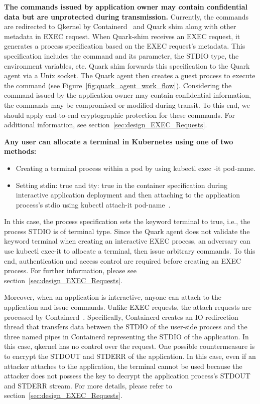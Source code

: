 \textbf{The commands issued by application owner may contain confidential data but are unprotected during transmission.} Currently, the commands are redirected to Qkernel by Containerd~\cite*{containerd} and Quark shim along with other metadata in EXEC request. When Quark-shim receives an EXEC request, it generates 
a process specification based on the EXEC request’s metadata. This specification includes the command and its parameter, the STDIO type, the environment variables, etc. Quark shim forwards this specification to the Quark agent via a Unix socket. The Quark agent then creates a guest process to 
execute the command (see Figure~\ref*{fig:quark_agent_work_flow}). Considering the command issued by the application owner may contain confidential information, the commands may be compromised or modified during transit. To this end, we should apply end-to-end cryptographic protection for these 
commands. For additional information, see section~\ref{sec:design_EXEC_Requests}.


\textbf{Any user can allocate a terminal in Kubernetes using one of two methods:}

\begin{itemize}
  \item Creating a terminal process within a pod by using kubectl exec -it pod-name.
  \item Setting stdin: true and tty: true in the container specification during interactive application deployment and then attaching to the application process's stdio using kubectl attach-it pod-name~\cite*{Understanding_sdin}.
\end{itemize}
In this case, the process specification sets the keyword terminal to true, i.e., the process STDIO is of terminal type. Since the Quark agent does not validate the keyword terminal when creating an interactive  EXEC process, an adversary can use kubectl exec-it to allocate a terminal, then issue 
arbitrary commands. To this end, authentication and access control are required before creating an EXEC process. For further information, please see section~\ref{sec:design_EXEC_Requests}.


Moreover, when an application is interactive, anyone can attach to the application and issue commands. Unlike EXEC requests, the attach requests are processed by Containerd~\cite*{containerd}. Specifically, Containerd creates an IO redirection thread that transfers data between the STDIO of the 
user-side process and the three named pipes in Containerd representing the STDIO of the application. In this case, qkernel has no control over the request. One possible countermeasure is to encrypt the STDOUT and STDERR of the application. In this case, even if an attacker attaches to the application, 
the terminal cannot be used because the attacker does not possess the key to decrypt the application process’s STDOUT and STDERR stream. For more details, please refer to section~\ref{sec:design_EXEC_Requests}.


